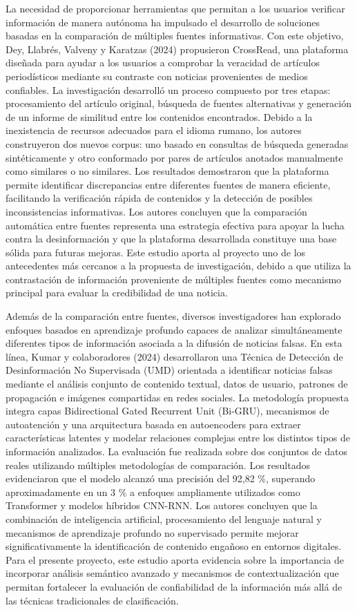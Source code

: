 \documentclass[12pt]{article}
\begin{document}
La necesidad de proporcionar herramientas que permitan a los usuarios verificar información de manera autónoma ha impulsado el desarrollo de soluciones basadas en la comparación de múltiples fuentes informativas. Con este objetivo, Dey, Llabrés, Valveny y Karatzas (2024) propusieron CrossRead, una plataforma diseñada para ayudar a los usuarios a comprobar la veracidad de artículos periodísticos mediante su contraste con noticias provenientes de medios confiables. La investigación desarrolló un proceso compuesto por tres etapas: procesamiento del artículo original, búsqueda de fuentes alternativas y generación de un informe de similitud entre los contenidos encontrados. Debido a la inexistencia de recursos adecuados para el idioma rumano, los autores construyeron dos nuevos corpus: uno basado en consultas de búsqueda generadas sintéticamente y otro conformado por pares de artículos anotados manualmente como similares o no similares. Los resultados demostraron que la plataforma permite identificar discrepancias entre diferentes fuentes de manera eficiente, facilitando la verificación rápida de contenidos y la detección de posibles inconsistencias informativas. Los autores concluyen que la comparación automática entre fuentes representa una estrategia efectiva para apoyar la lucha contra la desinformación y que la plataforma desarrollada constituye una base sólida para futuras mejoras. Este estudio aporta al proyecto uno de los antecedentes más cercanos a la propuesta de investigación, debido a que utiliza la contrastación de información proveniente de múltiples fuentes como mecanismo principal para evaluar la credibilidad de una noticia. 

Además de la comparación entre fuentes, diversos investigadores han explorado enfoques basados en aprendizaje profundo capaces de analizar simultáneamente diferentes tipos de información asociada a la difusión de noticias falsas. En esta línea, Kumar y colaboradores (2024) desarrollaron una Técnica de Detección de Desinformación No Supervisada (UMD) orientada a identificar noticias falsas mediante el análisis conjunto de contenido textual, datos de usuario, patrones de propagación e imágenes compartidas en redes sociales. La metodología propuesta integra capas Bidirectional Gated Recurrent Unit (Bi-GRU), mecanismos de autoatención y una arquitectura basada en autoencoders para extraer características latentes y modelar relaciones complejas entre los distintos tipos de información analizados. La evaluación fue realizada sobre dos conjuntos de datos reales utilizando múltiples metodologías de comparación. Los resultados evidenciaron que el modelo alcanzó una precisión del 92,82 \%, superando aproximadamente en un 3 \% a enfoques ampliamente utilizados como Transformer y modelos híbridos CNN-RNN. Los autores concluyen que la combinación de inteligencia artificial, procesamiento del lenguaje natural y mecanismos de aprendizaje profundo no supervisado permite mejorar significativamente la identificación de contenido engañoso en entornos digitales. Para el presente proyecto, este estudio aporta evidencia sobre la importancia de incorporar análisis semántico avanzado y mecanismos de contextualización que permitan fortalecer la evaluación de confiabilidad de la información más allá de las técnicas tradicionales de clasificación. 
\end{document}
